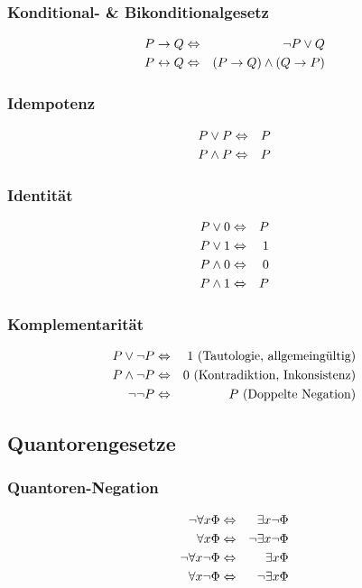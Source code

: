 \documentclass[a4paper]{scrartcl}
\begin{document}
\subsubsection{Konditional- \& Bikonditionalgesetz}
\begin{eqnarray*}
	P \rightarrow Q & \Leftrightarrow & \neg P \vee Q\\
	P \leftrightarrow Q  & \Leftrightarrow & (P \rightarrow Q) \wedge (Q \rightarrow P)
\end{eqnarray*}

\subsubsection{Idempotenz}
\begin{eqnarray*}
	P \vee P   & \Leftrightarrow & P \\
	P \wedge P & \Leftrightarrow & P
\end{eqnarray*}

\subsubsection{Identität}
\begin{eqnarray*}
	P \vee 0   & \Leftrightarrow & P \\
	P \vee 1   & \Leftrightarrow & 1 \\
	P \wedge 0 & \Leftrightarrow & 0 \\
	P \wedge 1 & \Leftrightarrow & P
\end{eqnarray*}

\subsubsection{Komplementarität}
\begin{eqnarray*}
	P \vee \neg P   & \Leftrightarrow & 1\ \text{(Tautologie, allgemeingültig)} \\
	P \wedge \neg P & \Leftrightarrow & 0\ \text{(Kontradiktion, Inkonsistenz)} \\
	\neg\neg P      & \Leftrightarrow & P\ \text{(Doppelte Negation)} 
\end{eqnarray*}

\subsection{Quantorengesetze}
\subsubsection{Quantoren-Negation}
\begin{eqnarray*}
	\neg \forall x \Phi      & \Leftrightarrow & \exists x \neg \Phi \\
	\forall x \Phi           & \Leftrightarrow & \neg \exists x \neg \Phi \\
	\neg \forall x \neg \Phi & \Leftrightarrow & \exists x \Phi \\
	\forall x \neg \Phi      & \Leftrightarrow & \neg \exists x \Phi
\end{eqnarray*}
\end{document}

